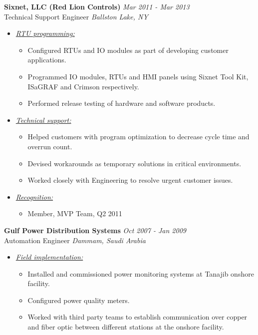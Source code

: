 \documentclass{article}
\begin{document}
    {\bf Sixnet, LLC (Red Lion Controls)} \hfill {\em Mar 2011 - Mar 2013} \\
    Technical Support Engineer \hfill {\em Ballston Lake, NY} \\
    \begin{itemize}
    \item \underline{\it RTU programming:}
          \begin{itemize}
          \item Configured RTUs and IO modules as part of developing customer
                applications.
          \item Programmed IO modules, RTUs and HMI panels using Sixnet Tool
                Kit, ISaGRAF and Crimson respectively.
          \item Performed release testing of hardware and software products.
          \end{itemize}
    \item \underline{\it Technical support:}
          \begin{itemize}
          \item Helped customers with program optimization to decrease cycle
                time and overrun count.
          \item Devised workarounds as temporary solutions in critical
                environments.
          \item Worked closely with Engineering to resolve urgent customer
                issues.
          \end{itemize}
    \item \underline{\it Recognition:}
          \begin{itemize}
          \item Member, MVP Team, Q2 2011
          \end{itemize}
    \end{itemize}
    \bigskip

    {\bf Gulf Power Distribution Systems} \hfill {\em Oct 2007 - Jan 2009} \\
    Automation Engineer \hfill {\em Dammam, Saudi Arabia} \\
    \begin{itemize}
    \item \underline{\it Field implementation:}
          \begin{itemize}
          \item Installed and commissioned power monitoring systems at Tanajib
                onshore facility.
          \item Configured power quality meters.
          \item Worked with third party teams to establish communication over
                copper and fiber optic between different stations at the onshore
                facility.
          \end{itemize}
    \end{itemize}
    \bigskip
\end{document}
